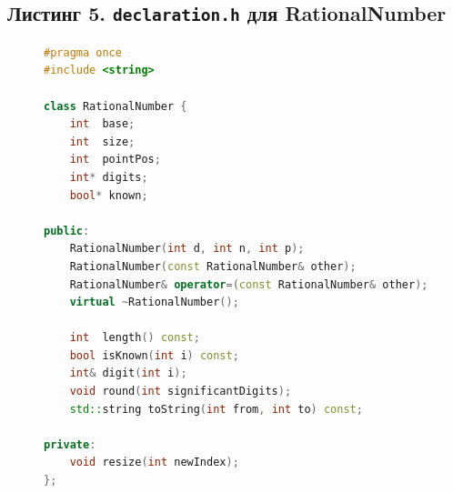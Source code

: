 \documentclass[a4paper, 14pt]{extarticle}
\begin{document}
\subsection*{Листинг 5. \texttt{declaration.h} для RationalNumber}
\begin{figure}[!htb]
\begin{lstlisting}[language=C++,caption={declaration.h для RationalNumber},label={lst:code5}]
#pragma once
#include <string>

class RationalNumber {
    int  base;
    int  size;
    int  pointPos;
    int* digits;
    bool* known;

public:
    RationalNumber(int d, int n, int p);
    RationalNumber(const RationalNumber& other);
    RationalNumber& operator=(const RationalNumber& other);
    virtual ~RationalNumber();

    int  length() const;
    bool isKnown(int i) const;
    int& digit(int i);
    void round(int significantDigits);
    std::string toString(int from, int to) const;

private:
    void resize(int newIndex);
};
\end{lstlisting}
\end{figure}
\end{document}

